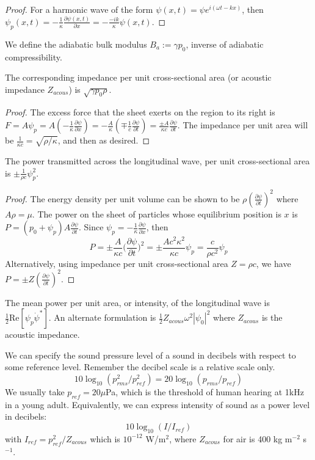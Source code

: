\documentclass[a4paper]{article}
\begin{document}
\begin{proof}
For a harmonic wave of the form $\psi(x,t)=\psi e^{i(\omega t-kx)}$, then $\psi_p(x,t)=-\frac{1}{\kappa}\frac{\partial\psi(x,t)}{\partial x}=-\frac{-ik}{\kappa}\psi(x,t)$. 
\end{proof}
\begin{defi}
We define the adiabatic bulk modulus $B_a:=\gamma p_0$, inverse of adiabatic compressibility.
\end{defi}
\begin{cor}
The corresponding impedance per unit cross-sectional area (or acoustic impedance $Z_{acous}$) is $\sqrt{\gamma p_0\rho}$.
\end{cor}
\begin{proof}
The excess force that the sheet exerts on the region to its right is $F=A\psi_p=A(-\frac{1}{\kappa}\frac{\partial\psi}{\partial x})=-\frac{A}{\kappa}(\mp\frac{1}{c}\frac{\partial\psi}{\partial t})=\frac{\pm A}{\kappa c}\frac{\partial\psi}{\partial t}$. The impedance per unit area will be $\frac{1}{\kappa c}=\sqrt{\rho/\kappa}$, and then as desired.
\end{proof}
\begin{thm}
The power transmitted across the longitudinal wave, per unit cross-sectional area is $\pm\frac{1}{\rho c}\psi_p^2$.
\end{thm}
\begin{proof}
The energy density per unit volume can be shown to be $\rho(\frac{\partial\psi}{\partial t})^2$ where $A\rho=\mu$. The power on the sheet of particles whose equilibrium position is $x$ is $P=(p_0+\psi_p)A\frac{\partial\psi}{\partial t}$. Since $\psi_p=-\frac{1}{\kappa}\frac{\partial\psi}{\partial x}$, then $$P=\pm\frac{A}{\kappa c}\bigg(\frac{\partial\psi}{\partial t}\bigg)^2=\pm\frac{Ac^2\kappa^2}{\kappa c}\psi_p=\frac{c}{\rho c^2}\psi_p$$ 
Alternatively, using impedance per unit cross-sectional area $Z=\rho c$, we have $P=\pm Z(\frac{\partial\psi}{\partial t})^2$.
\end{proof}
\begin{defi}[Intensity]
The mean power per unit area, or intensity, of the longitudinal wave is $\frac{1}{2}\text{Re}[\psi_p\dot{\psi}^*]$. An alternate formulation is $\frac{1}{2}Z_{acous}\omega^2|\psi_0|^2$ where $Z_{acous}$ is the acoustic impedance.
\end{defi}
\begin{defi}
We can specify the sound pressure level of a sound in decibels with respect to some reference level. Remember the decibel scale is a relative scale only.
$$10\log_{10}(p_{rms}^2/p_{ref}^2)=20\log_{10}(p_{rms}/p_{ref})$$
We usually take $p_{ref}=20\mu$Pa, which is the threshold of human hearing at 1kHz in a young adult. Equivalently, we can express intensity of sound as a power level in decibels:
$$10\log_{10}(I/I_{ref})$$
with $I_{ref}=p_{ref}^2/Z_{acous}$ which is $10^{-12}$ W/m$^2$, where $Z_{acous}$ for air is 400 kg m$^{-2}$ s$^{-1}$.
\end{defi}
\end{document}
